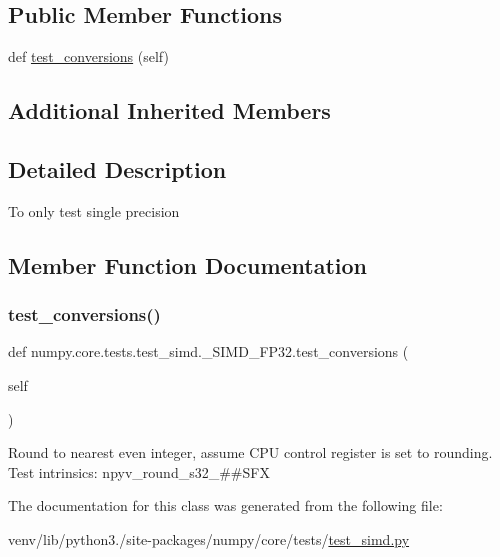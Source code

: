 \subsection*{Public Member Functions}
\begin{DoxyCompactItemize}
\item 
def \hyperlink{classnumpy_1_1core_1_1tests_1_1test__simd_1_1__SIMD__FP32_a5b23e89e84cb4efffba40d7bfafdfaa5}{test\+\_\+conversions} (self)
\end{DoxyCompactItemize}
\subsection*{Additional Inherited Members}


\subsection{Detailed Description}
\begin{DoxyVerb}To only test single precision
\end{DoxyVerb}
 

\subsection{Member Function Documentation}
\mbox{\label{classnumpy_1_1core_1_1tests_1_1test__simd_1_1__SIMD__FP32_a5b23e89e84cb4efffba40d7bfafdfaa5}} 
\subsubsection{\texorpdfstring{test\+\_\+conversions()}{test\_conversions()}}
{\footnotesize\ttfamily def numpy.\+core.\+tests.\+test\+\_\+simd.\+\_\+\+S\+I\+M\+D\+\_\+\+F\+P32.\+test\+\_\+conversions (\begin{DoxyParamCaption}\item[{}]{self }\end{DoxyParamCaption})}

\begin{DoxyVerb}Round to nearest even integer, assume CPU control register is set to rounding.
Test intrinsics:
    npyv_round_s32_##SFX
\end{DoxyVerb}
 

The documentation for this class was generated from the following file\+:\begin{DoxyCompactItemize}
\item 
venv/lib/python3./site-\/packages/numpy/core/tests/\hyperlink{test__simd_8py}{test\+\_\+simd.\+py}\end{DoxyCompactItemize}
